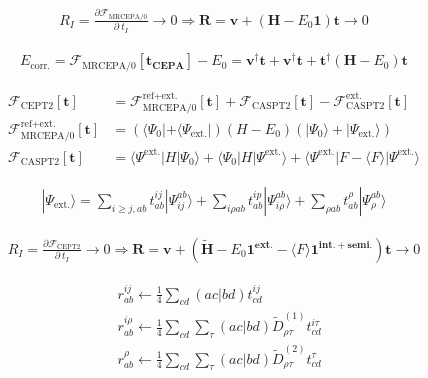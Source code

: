 \documentclass[11pt,pra,aps]{revtex4}
\begin{document}
\begin{align}
  R_I=\frac{\partial \mathscr{F}_\text{MRCEPA/0}}{\partial\ t_I}\rightarrow 0\Rightarrow \mathbf{R}=\mathbf{v}+(\mathbf{H}-E_0\mathbf{1})\mathbf{t}\rightarrow 0
\end{align}

\begin{align}
  E_\text{corr.} = \mathscr{F}_\text{MRCEPA/0}[\mathbf{t_\text{CEPA}}]-E_0=\mathbf{v}^\dagger\mathbf{t}+\mathbf{v}^\dagger\mathbf{t}+\mathbf{t}^\dagger(\mathbf{H}-E_0)\mathbf{t}
\end{align}

\begin{align}
  \mathscr{F}_\text{CEPT2}[\mathbf{t}]&=\mathscr{F}^\text{ref+ext.}_\text{MRCEPA/0}[\mathbf{t}]+\mathscr{F}_\text{CASPT2}[\mathbf{t}]-\mathscr{F}^\text{ext.}_\text{CASPT2}[\mathbf{t}] \\
  \mathscr{F}^\text{ref+ext.}_\text{MRCEPA/0}[\mathbf{t}]&=\left(\langle\Psi_0|+\langle\Psi_\text{ext.}|\right)\left(H-E_0\right)\left(|\Psi_0\rangle+|\Psi_\text{ext.}\rangle\right) \\
  \mathscr{F}_\text{CASPT2}[\mathbf{t}]&=\langle\Psi^\text{ext.}|H|\Psi_0\rangle+\langle\Psi_0|H|\Psi^\text{ext.}\rangle+\langle\Psi^\text{ext.}|F-\langle F\rangle|\Psi^\text{ext.}\rangle
\end{align}

\begin{align}
|\Psi_\text{ext.}\rangle=\sum_{i\geq j,ab}t_{ab}^{ij}|\Psi_{ij}^{ab}\rangle+\sum_{i\rho ab}t_{ab}^{ip}|\Psi_{i\rho}^{ab}\rangle+\sum_{\rho ab}t_{ab}^{\rho}|\Psi_{\rho}^{ab}\rangle
\end{align}

\begin{align}
  R_I=\frac{\partial \mathscr{F}_\text{CEPT2}}{\partial\ t_I}\rightarrow 0\Rightarrow \mathbf{R}=\mathbf{v}+(\mathbf{\tilde{H}}-E_0\mathbf{1^{ext.}}-\langle F\rangle\mathbf{1^{int.+semi.}})\mathbf{t}\rightarrow 0
\end{align}

\begin{align}
  &r^{ij}_{ab}\leftarrow\frac{1}{4}\sum_{cd} (ac|bd) t^{ij}_{cd} \\
  &r^{i\rho}_{ab}\leftarrow\frac{1}{4}\sum_{cd} \sum_\tau (ac|bd) \tilde{D}^{(1)}_{\rho\tau}t^{i\tau}_{cd} \\  
  &r^{\rho}_{ab}\leftarrow\frac{1}{4}\sum_{cd} \sum_\tau (ac|bd) \tilde{D}^{(2)}_{\rho\tau}t^{\tau}_{cd}
\end{align}
\end{document}
